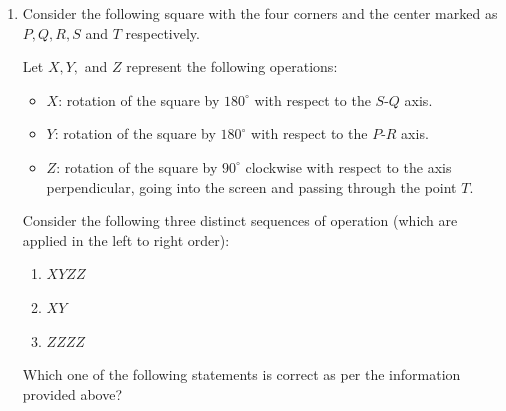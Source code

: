 \documentclass[journal,12pt,onecolumn]{IEEEtran}
\theoremstyle{remark}
\begin{document}
\begin{enumerate}
\textbf{Statement of Q:} S has copied in the exam.  

\textbf{Statement of R:} P did not copy in the exam.  

\textbf{Statement of S:} Only one of us is telling the truth.  

\textbf{Statement of T:} R is telling the truth.  

The investigating team had authentic information that $S$ never lies.  

Based on the information given above, the person who has copied in the exam is \_\_\_\_\_\_. 

\hfill{}
\begin{multicols}{2}
\begin{enumerate}
    \item R
    \item P
    \item Q
    \item T
\end{enumerate}
\end{multicols}
\item Consider the following square with the four corners and the center marked as $P, Q, R, S$ and $T$ respectively.  

Let $X, Y,$ and $Z$ represent the following operations:  

\begin{itemize}
    \item $X$: rotation of the square by $180^\circ$ with respect to the $S$-$Q$ axis.  
    \item $Y$: rotation of the square by $180^\circ$ with respect to the $P$-$R$ axis.  
    \item $Z$: rotation of the square by $90^\circ$ clockwise with respect to the axis perpendicular, going into the screen and passing through the point $T$.  
\end{itemize}

Consider the following three distinct sequences of operation (which are applied in the left to right order): 
\begin{enumerate}
    \item $XYZZ$
    \item $XY$
    \item $ZZZZ$
\end{enumerate}

Which one of the following statements is correct as per the information provided above?  


\end{enumerate}
\end{document}
